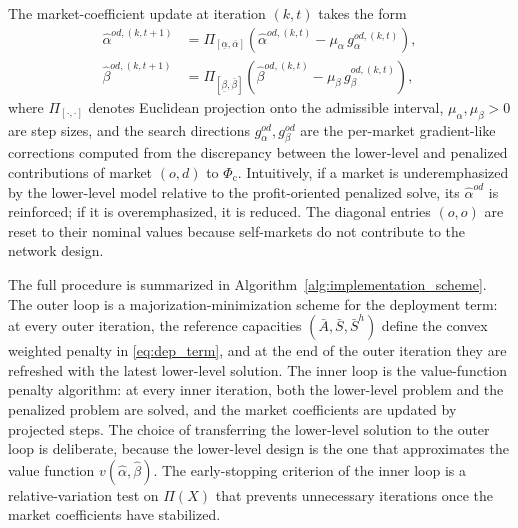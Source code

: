 The market-coefficient update at iteration $(k,t)$ takes the form
\begin{align}
\widehat{\alpha}^{od,(k,t+1)}
&=\Pi_{[\underline{\alpha},\overline{\alpha}]}\!\left(\widehat{\alpha}^{od,(k,t)}-\mu_\alpha\,g_\alpha^{od,(k,t)}\right),
\label{eq:alpha_update}
\\
\widehat{\beta}^{od,(k,t+1)}
&=\Pi_{[\underline{\beta},\overline{\beta}]}\!\left(\widehat{\beta}^{od,(k,t)}-\mu_\beta\,g_\beta^{od,(k,t)}\right),
\label{eq:beta_update}
\end{align}
where $\Pi_{[\cdot,\cdot]}$ denotes Euclidean projection onto the admissible interval, $\mu_\alpha,\mu_\beta>0$ are step sizes, and the search directions $g_\alpha^{od},g_\beta^{od}$ are the per-market gradient-like corrections computed from the discrepancy between the lower-level and penalized contributions of market $(o,d)$ to $\Phi_{\mathrm{c}}$. Intuitively, if a market is underemphasized by the lower-level model relative to the profit-oriented penalized solve, its $\widehat{\alpha}^{od}$ is reinforced; if it is overemphasized, it is reduced. The diagonal entries $(o,o)$ are reset to their nominal values because self-markets do not contribute to the network design.

The full procedure is summarized in Algorithm~\ref{alg:implementation_scheme}. The outer loop is a majorization-minimization scheme for the deployment term: at every outer iteration, the reference capacities $(\bar A,\bar S,\bar S^h)$ define the convex weighted penalty in \eqref{eq:dep_term}, and at the end of the outer iteration they are refreshed with the latest lower-level solution. The inner loop is the value-function penalty algorithm: at every inner iteration, both the lower-level problem and the penalized problem are solved, and the market coefficients are updated by projected steps. The choice of transferring the lower-level solution to the outer loop is deliberate, because the lower-level design is the one that approximates the value function $v(\widehat{\alpha},\widehat{\beta})$. The early-stopping criterion of the inner loop is a relative-variation test on $\Pi(X)$ that prevents unnecessary iterations once the market coefficients have stabilized.

